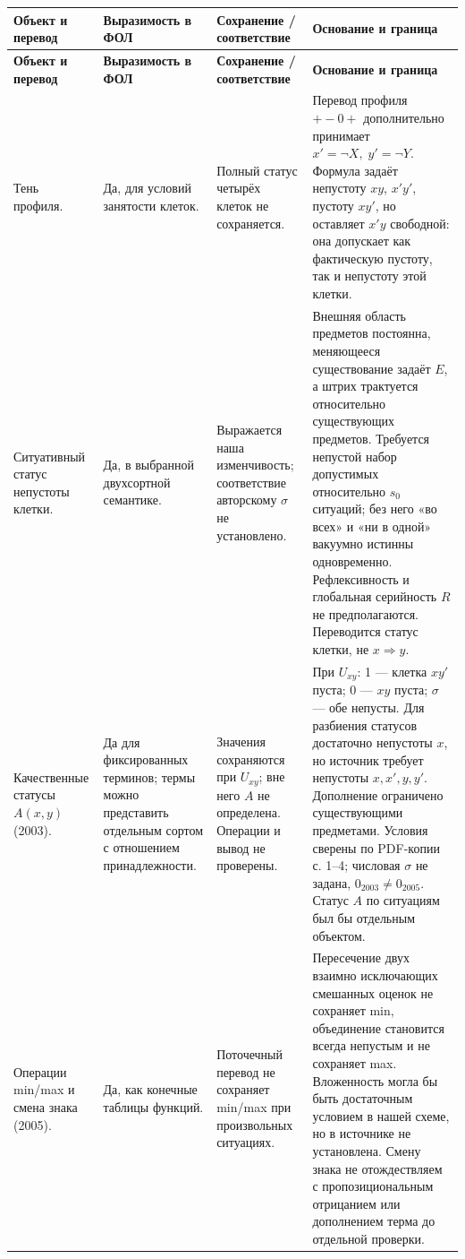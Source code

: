 \documentclass[12pt,a4paper]{article}
\begin{document}
\small
\begin{longtable}{P{0.18\textwidth}P{0.15\textwidth}P{0.25\textwidth}P{0.32\textwidth}}
\toprule
\textbf{Объект и перевод} & \textbf{Выразимость в ФОЛ} & \textbf{Сохранение / соответствие} & \textbf{Основание и граница} \\
\midrule
\endfirsthead
\toprule
\textbf{Объект и перевод} & \textbf{Выразимость в ФОЛ} & \textbf{Сохранение / соответствие} & \textbf{Основание и граница} \\
\midrule
\endhead
Тень профиля. & Да, для условий занятости клеток. & Полный статус четырёх клеток не сохраняется. & Перевод профиля \(+-0+\) дополнительно принимает \(x'=\neg X,\;y'=\neg Y\). Формула задаёт непустоту \(xy\), \(x'y'\), пустоту \(xy'\), но оставляет \(x'y\) свободной: она допускает как фактическую пустоту, так и непустоту этой клетки. \\
Ситуативный статус непустоты клетки. & Да, в выбранной двухсортной семантике. & Выражается наша изменчивость; соответствие авторскому \(\sigma\) не установлено. & Внешняя область предметов постоянна, меняющееся существование задаёт \(E\), а штрих трактуется относительно существующих предметов. Требуется непустой набор допустимых относительно \(s_0\) ситуаций; без него «во всех» и «ни в одной» вакуумно истинны одновременно. Рефлексивность и глобальная серийность \(R\) не предполагаются. Переводится статус клетки, не \(x\Rightarrow y\). \\
Качественные статусы \(A(x,y)\) (2003). & Да для фиксированных терминов; термы можно представить отдельным сортом с отношением принадлежности. & Значения сохраняются при \(U_{xy}\); вне него \(A\) не определена. Операции и вывод не проверены. & При \(U_{xy}\): 1 — клетка \(xy'\) пуста; 0 — \(xy\) пуста; \(\sigma\) — обе непусты. Для разбиения статусов достаточно непустоты \(x\), но источник требует непустоты \(x,x',y,y'\). Дополнение ограничено существующими предметами. Условия сверены по PDF-копии с. 1–4; числовая \(\sigma\) не задана, \(0_{2003}\ne0_{2005}\). Статус \(A\) по ситуациям был бы отдельным объектом. \\
Операции min/max и смена знака (2005). & Да, как конечные таблицы функций. & Поточечный перевод не сохраняет min/max при произвольных ситуациях. & Пересечение двух взаимно исключающих смешанных оценок не сохраняет min, объединение становится всегда непустым и не сохраняет max. Вложенность могла бы быть достаточным условием в нашей схеме, но в источнике не установлена. Смену знака не отождествляем с пропозициональным отрицанием или дополнением терма до отдельной проверки. \\

\end{longtable}
\end{document}
